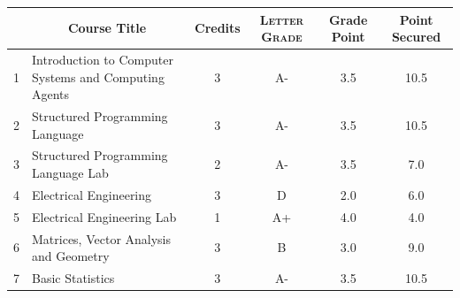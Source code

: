 \documentclass[11pt]{article}
\newcommand*{\numtwo}[1]{\pgfmathprintnumber[
                    fixed, precision=2, fixed zerofill=true]{#1}}
\begin{document}
                \begin{center}
                    \renewcommand{\arraystretch}{1.08}
                    
                \begin{tabular}{|c|l|c|>{\scshape}c|c|c|}
                \hline  \rule[-1ex]{0pt}{3.5ex} {\centering{\bf Course Code}} &  \multicolumn{1}{c|}{\textbf{Course Title}}  & {\bf Credits} & {\bf Letter Grade} & {\bf Grade Point} & {\bf Point Secured}  \\ 
                \hline   1 &  Introduction to Computer Systems and Computing Agents		 & 3 & A- & 3.5 & 10.5 \\ %
                \hline   2 &  Structured Programming Language		 & 3 & A- & 3.5 & 10.5 \\ %
                \hline   3 &  Structured Programming Language Lab		 & 2 & A- & 3.5 & 7.0 \\ %
                \hline   4 &  Electrical Engineering		 & 3 & D & 2.0 & 6.0 \\ %
                \hline   5 &  Electrical Engineering Lab		 & 1 & A+ & 4.0 & 4.0 \\ %
                \hline   6 &  Matrices, Vector Analysis and Geometry		 & 3 & B & 3.0 & 9.0 \\ %
                \hline   7 &  Basic Statistics		 & 3 & A- & 3.5 & 10.5 \\ %

\hline                %
                \end{tabular}
                \end{center}
                \renewcommand{\arraystretch}{1.03}
\end{document}
